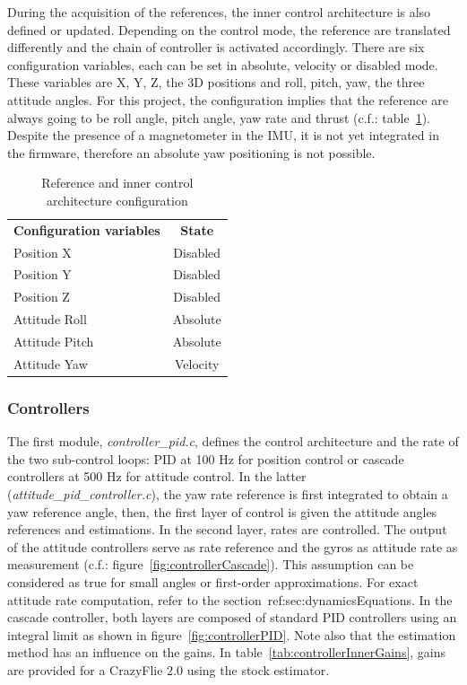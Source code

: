 \documentclass[a4paper, 12pt]{report}
\begin{document}
During the acquisition of the references, the inner control architecture is also defined or updated. Depending on the control mode, the reference are translated differently and the chain of controller is activated accordingly. There are six configuration variables, each can be set in absolute, velocity or disabled mode.  These variables are X, Y, Z, the 3D positions and roll, pitch, yaw, the three attitude angles. For this project, the configuration implies that the reference are always going to be roll angle, pitch angle, yaw rate and thrust (c.f.: table~\ref{tab:setpointConfig}). Despite the presence of a magnetometer in the IMU, it is not yet integrated in the firmware, therefore an absolute yaw positioning is not possible.
\begin{table}[htbp]
\centering
\caption{Reference and inner control architecture configuration}
\begin{tabular}{|l|c|}
\hline
\textbf{Configuration variables} & \textbf{State}  \\
\hhline{|=|=|}
Position X & Disabled \\
\hline
Position Y & Disabled \\
\hline
Position Z & Disabled \\
\hline
Attitude Roll & Absolute\\
\hline
Attitude Pitch & Absolute\\
\hline
Attitude Yaw & Velocity\\
\hline
\end{tabular}
\label{tab:setpointConfig}
\end{table}

\subsubsection{Controllers}
The first module, \emph{controller\_pid.c}, defines the control architecture and the rate of the two sub-control loops: PID at 100 Hz for position control or cascade controllers at 500 Hz for attitude control. In the latter (\emph{attitude\_pid\_controller.c}), the yaw rate reference is first integrated to obtain a yaw reference angle, then, the first layer of control is given the attitude angles references and estimations. In the second layer, rates are controlled. The output of the attitude controllers serve as rate reference and the gyros as attitude rate as measurement (c.f.: figure~\ref{fig:controllerCascade}). This assumption can be considered as true for small angles or first-order approximations. For exact attitude rate computation, refer to the section~ref:{sec:dynamicsEquations}.  In the cascade controller, both layers  are composed of standard PID controllers using an integral limit as shown in figure~\ref{fig:controllerPID}. Note also that the estimation method has an influence on the gains. In table~\ref{tab:controllerInnerGains}, gains are provided for a CrazyFlie 2.0 using the stock estimator.
\end{document}
